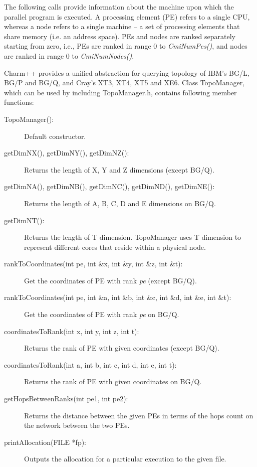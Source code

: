 The following calls provide information about the machine upon which the
parallel program is executed. A processing element (PE) refers to a single CPU,
whereas a node refers to a single machine -- a set of processing elements that share
memory (i.e. an address space).  PEs and nodes are ranked separately starting
from zero, i.e., PEs are ranked in range 0 to {\em CmiNumPes()}, and nodes are
ranked in range 0 to {\em CmiNumNodes()}.

Charm++ provides a unified abstraction for querying topology of IBM's BG/L, BG/P
and BG/Q, and Cray's XT3, XT4, XT5 and XE6. Class TopoManager, which can be used 
by including TopoManager.h, contains following member functions:

\begin{description}
\item [TopoManager():] Default constructor.
\item [getDimNX(), getDimNY(), getDimNZ():] Returns the length of X, Y and Z
dimensions (except BG/Q).
\item [getDimNA(), getDimNB(), getDimNC(), getDimND(), getDimNE():] Returns the
length of A, B, C, D and E dimensions on BG/Q.
\item [getDimNT():] Returns the length of T dimension. TopoManager uses T
dimension to represent different cores that reside within a physical node.
\item [rankToCoordinates(int pe, int \&x, int \&y, int \&z, int \&t):] Get the
coordinates of PE with rank {\em pe} (except BG/Q).
\item [rankToCoordinates(int pe, int \&a, int \&b, int \&c, int \&d, int \&e, int
\&t):] Get the coordinates of PE with rank {\em pe} on BG/Q.
\item [coordinatesToRank(int x, int y, int z, int t):] Returns the rank of PE
with given coordinates (except BG/Q).
\item [coordinatesToRank(int a, int b, int c, int d, int e, int t):] Returns the
rank of PE with given coordinates on BG/Q.
\item [getHopsBetweenRanks(int pe1, int pe2):] Returns the distance between the
given PEs in terms of the hops count on the network between the two PEs.
\item [printAllocation(FILE *fp):] Outputs the allocation for a particular
execution to the given file.
\end{description}

